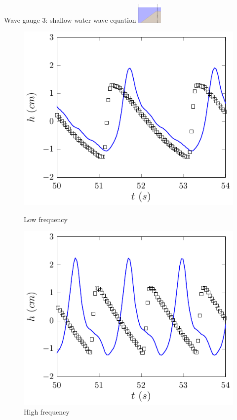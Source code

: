\documentclass[pdf]{beamer}
\begin{document}
\begin{frame}{Wave gauge 3: shallow water wave equation \space\space	\includegraphics[width=1.2cm]{./Pics/WT3z.pdf}  }
	\begin{figure}
		\centering
		\begin{minipage}{.5\textwidth}
			\centering
			\includegraphics[width=0.9\linewidth]{./Pics/SL/WG3/1SWW-figure0.pdf}
			\caption{Low frequency}
		\end{minipage}%
		\begin{minipage}{.5\textwidth}
			\centering
			\includegraphics[width=0.9\linewidth]{./Pics/SH/WG3/1SWW-figure0.pdf}
			\caption{High frequency}
		\end{minipage}
	\end{figure}
\end{frame}
\end{document}
